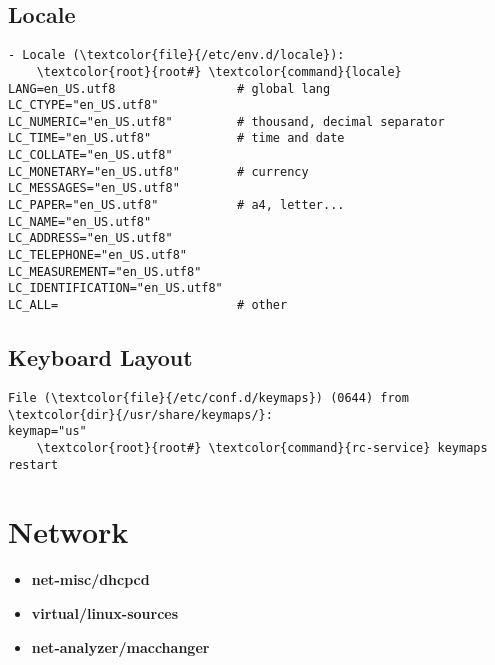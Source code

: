 \documentclass[10pt, a4paper, onecolumn, openany]{book}         %
\begin{document}
\section{Locale}
\begin{Verbatim}[commandchars=\\\{\}]
- Locale (\textcolor{file}{/etc/env.d/locale}):
    \textcolor{root}{root#} \textcolor{command}{locale}
LANG=en_US.utf8                 # global lang
LC_CTYPE="en_US.utf8"           
LC_NUMERIC="en_US.utf8"         # thousand, decimal separator
LC_TIME="en_US.utf8"            # time and date
LC_COLLATE="en_US.utf8"
LC_MONETARY="en_US.utf8"        # currency
LC_MESSAGES="en_US.utf8"
LC_PAPER="en_US.utf8"           # a4, letter...
LC_NAME="en_US.utf8"
LC_ADDRESS="en_US.utf8"
LC_TELEPHONE="en_US.utf8"
LC_MEASUREMENT="en_US.utf8"
LC_IDENTIFICATION="en_US.utf8"  
LC_ALL=                         # other
\end{Verbatim}

\section{Keyboard Layout}
\begin{Verbatim}[commandchars=\\\{\}]
File (\textcolor{file}{/etc/conf.d/keymaps}) (0644) from \textcolor{dir}{/usr/share/keymaps/}:
keymap="us"
    \textcolor{root}{root#} \textcolor{command}{rc-service} keymaps restart
\end{Verbatim}


\chapter{Network}%
\begin{itemize}
    \item \textbf{net-misc/dhcpcd}
    \item \textbf{virtual/linux-sources}
    \item \textbf{net-analyzer/macchanger}
\end{itemize}
\end{document}
